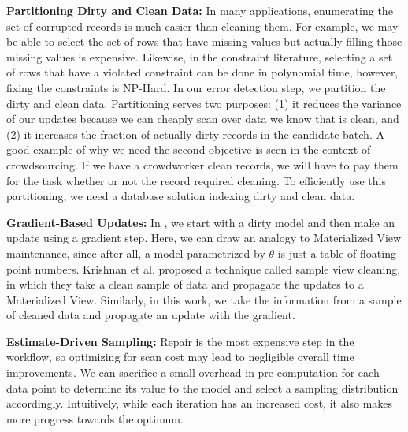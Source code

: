 \vspace{0.5em}

\noindent\textbf{Partitioning Dirty and Clean Data: } In many applications, enumerating the set of corrupted records is much easier than cleaning them. For example, we may be able to select the set of rows that have missing values but actually filling those missing values is expensive. Likewise, in the constraint literature, selecting a set of rows that have a violated constraint can be done in polynomial time, however, fixing the constraints is NP-Hard.
In our error detection step, we partition the dirty and clean data.
Partitioning serves two purposes: (1) it reduces the variance of our updates because we can cheaply scan over data we know that is clean, and (2) it increases the fraction of actually dirty records in the candidate batch.
A good example of why we need the second objective is seen in the context of crowdsourcing.
If we have a crowdworker clean records, we will have to pay them for the task whether or not the record required cleaning.
To efficiently use this partitioning, we need a database solution indexing dirty and clean data.

\vspace{0.5em}

\noindent\textbf{Gradient-Based Updates: } In \sys, we start with a dirty model and then make an update using a gradient step. Here, we can draw an analogy to Materialized View maintenance, since after all, a model parametrized by $\theta$ is just a table of floating point numbers.
Krishnan et al. proposed a technique called sample view cleaning, in which they take a clean sample of data and propagate the updates to a Materialized View.
Similarly, in this work, we take the information from a sample of cleaned data and propagate an update with the gradient.

\vspace{0.5em}

\noindent\textbf{Estimate-Driven Sampling: } Repair is the most expensive step in the workflow, so optimizing for scan cost may lead to negligible overall time improvements.
We can sacrifice a small overhead in pre-computation for each data point to determine its value to the model and select a sampling distribution accordingly.
Intuitively, while each iteration has an increased cost, it also makes more progress towards the optimum.
\fi


